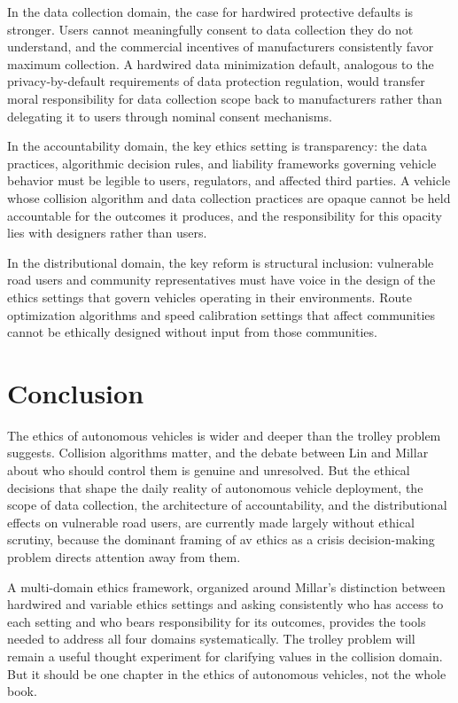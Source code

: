 \documentclass{ieee-portfolio}
\begin{document}
In the data collection domain, the case for hardwired protective defaults is stronger. Users cannot meaningfully consent to data collection they do not understand, and the commercial incentives of manufacturers consistently favor maximum collection. A hardwired data minimization default, analogous to the privacy-by-default requirements of data protection regulation, would transfer moral responsibility for data collection scope back to manufacturers rather than delegating it to users through nominal consent mechanisms.
 
In the accountability domain, the key ethics setting is transparency: the data practices, algorithmic decision rules, and liability frameworks governing vehicle behavior must be legible to users, regulators, and affected third parties. A vehicle whose collision algorithm and data collection practices are opaque cannot be held accountable for the outcomes it produces, and the responsibility for this opacity lies with designers rather than users.
 
In the distributional domain, the key reform is structural inclusion: vulnerable road users and community representatives must have voice in the design of the ethics settings that govern vehicles operating in their environments. Route optimization algorithms and speed calibration settings that affect communities cannot be ethically designed without input from those communities.
 
\section{Conclusion}
 
The ethics of autonomous vehicles is wider and deeper than the trolley problem suggests. Collision algorithms matter, and the debate between Lin and Millar about who should control them is genuine and unresolved. But the ethical decisions that shape the daily reality of autonomous vehicle deployment, the scope of data collection, the architecture of accountability, and the distributional effects on vulnerable road users, are currently made largely without ethical scrutiny, because the dominant framing of \gls{av} ethics as a crisis decision-making problem directs attention away from them.
 
A multi-domain ethics framework, organized around Millar's distinction between hardwired and variable ethics settings and asking consistently who has access to each setting and who bears responsibility for its outcomes, provides the tools needed to address all four domains systematically. The trolley problem will remain a useful thought experiment for clarifying values in the collision domain. But it should be one chapter in the ethics of autonomous vehicles, not the whole book.
 
\glsaddall
\printglossary[type=\acronymtype,title=List of Acronyms]



\end{document}
